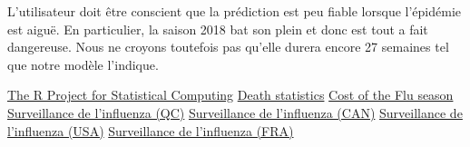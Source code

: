 \documentclass[12pt]{article}
\begin{document}
L'utilisateur doit \^etre conscient que la pr\'ediction est peu fiable lorsque l'\'epid\'emie est aigu\"e. En particulier, la saison 2018 bat son plein et donc est tout a fait dangereuse.
Nous ne croyons toutefois pas qu'elle durera encore 27 semaines tel que notre mod\`ele l'indique.
\clearpage

\begin{thebibliography}{9}
     \href{https://www.r-project.org/}{The R Project for Statistical Computing}
     \href{http://www.who.int/mediacentre/news/releases/2017/seasonal-flu/en/}{Death statistics}
     \href{https://en.wikipedia.org/wiki/Flu\_season\#Cost}{Cost of the Flu season}
     \href{https://www.inspq.qc.ca/influenza}{Surveillance de l'influenza (QC)}
     \href{https://www.canada.ca/fr/sante-publique/services/maladies/grippe-influenza/surveillance-influenza/rapports-hebdomadaires-influenza.html}{Surveillance de l'influenza (CAN)}
     \href{https://www.cdc.gov/flu/weekly/}{Surveillance de l'influenza (USA)}
     \href{http://invs.santepubliquefrance.fr/Dossiers-thematiques/Maladies-infectieuses/Maladies-a-prevention-vaccinale/Grippe/Grippe-generalites/Donnees-de-surveillance}{Surveillance de l'influenza (FRA)}
\end{thebibliography}
\end{document}

